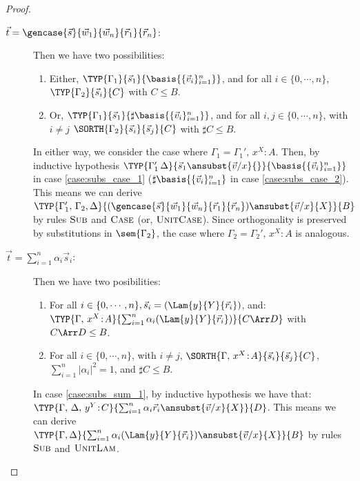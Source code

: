 \begin{proof}
\begin{description}
    \item[$\vec{t}=\gencase{\vec{s}}{\vec{w}_{1}}{\vec{w}_{n}}{\vec{r}_{1}}{\vec{r}_{n}}$:] Then we have two possibilities:
    \begin{enumerate}
      \item\label{case:subs_case_1} Either, $\TYP{\Gamma_1}{\vec{s}_{1}}{\basis{\{\vec{v}_{i}\}_{i=1}^n}}$, and for all $i\in\{0,\dotsb,n\}$, $\TYP{\Gamma_2}{\vec{s}_{i}}{C}$ with $C\leq B$.
      \item\label{case:subs_case_2} Or, $\TYP{\Gamma_1}{\vec{s}_{1}}{\sharp\basis{\{\vec{v}_{i}\}_{i=1}^n}}$, and for all $i,j\in\{0,\dotsb,n\}$, with $i\neq j$ $\SORTH{\Gamma_2}{\vec{s}_{i}}{\vec{s}_{j}}{C}$ with $\sharp C\leq B$.
    \end{enumerate}
    In either way, we consider the case where $\Gamma_1 = \Gamma_1',\,x^{X}\!:\!A$. Then, by inductive hypothesis $\TYP{\Gamma_1'\,\Delta}{\vec{s}_{1}\ansubst{\vec{v}/x}{}}{\basis{\{\vec{v}_{i}\}_{i=1}^n}}$ in case \ref{case:subs_case_1} ($\sharp \basis{\{\vec{v}_{i}\}_{i=1}^n}$ in case \ref{case:subs_case_2}). This means we can derive $\TYP{\Gamma_1',\,\Gamma_2,\Delta}{(\gencase{\vec{s}}{\vec{w}_{1}}{\vec{w}_{n}}{\vec{r}_{1}}{\vec{r}_{n}})\ansubst{\vec{v}/x}{X}}{B}$ by rules $\textsc{Sub}$ and $\textsc{Case}$ (or, $\textsc{UnitCase}$). Since orthogonality is preserved by substitutions in $\sem{\Gamma_2}$, the case where $\Gamma_2 = \Gamma_2',\,x^{X}\!:\!A$ is analogous.

    \item[$\vec{t}=\sum_{i=1}^{n}\alpha_i \vec{s}_{i}$:] Then we have two posibilities:
    \begin{enumerate}
      \item\label{case:subs_sum_1} For all $i\in\{0,\dotsb, n\}, \vec{s}_{i}=(\Lam{y}{Y}{\vec{r}_{i}})$, and:\\
      $\TYP{\Gamma,\,x^{X}\!:\!A}{\sum_{i=1}^{n}\alpha_i(\Lam{y}{Y}{\vec{r}_{i}})}{C\Arr D}$ with $C\Arr D\leq B$.
      \item\label{case:subs_sum_2} For all $i\in\{0,\dotsb, n\}$, with $i\neq j$, $\SORTH{\Gamma,\,x^{X}\!:\!A}{\vec{s}_{i}}{\vec{s}_{j}}{C}$, $\sum_{i=1}^{n}|\alpha_i|^2=1$, and $\sharp C\leq B$.
    \end{enumerate}
    
    In case \ref{case:subs_sum_1}, by inductive hypothesis we have that:\\
    $\TYP{\Gamma,\,\Delta,\,y^{Y}\!:\!C}{\sum_{i=1}^{n}\alpha_i \vec{r}_{i}\ansubst{\vec{v}/x}{X}}{D}$. This means we can derive \\$\TYP{\Gamma,\Delta}{\sum_{i=1}^{n}\alpha_i (\Lam{y}{Y}{\vec{r}_{i}})\ansubst{\vec{v}/x}{X}}{B}$ by rules $\textsc{Sub}$ and $\textsc{UnitLam}$.


\end{description}
\end{proof}
